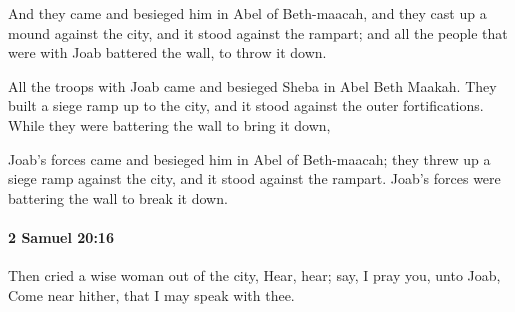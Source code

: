 			\begin{versebox}
					\item[BHS] 
					\item[ASV] And they came and besieged him in Abel of Beth-maacah, and they cast up a mound against the city, and it stood against the rampart; and all the people that were with Joab battered the wall, to throw it down.
					\item[NIV] All the troops with Joab came and besieged Sheba in Abel Beth Maakah. They built a siege ramp up to the city, and it stood against the outer fortifications. While they were battering the wall to bring it down,
					\item[NRSV] Joab’s forces came and besieged him in Abel of Beth-maacah; they threw up a siege ramp against the city, and it stood against the rampart. Joab’s forces were battering the wall to break it down.
			\end{versebox}

		\paragraph{2 Samuel 20:16} %
			\label{2SAMUEL-20-16}

			Then cried a wise woman out of the city, Hear, hear; say, I pray you, unto Joab, Come near hither, that I may speak with thee.

